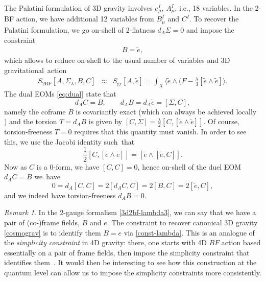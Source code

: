\documentclass[onecolumn]{article}
\theoremstyle{theorem}
\theoremstyle{remark}
\newtheorem{remark}{Remark}[section]
\theoremstyle{example}
\theoremstyle{definition}
\numberwithin{equation}{section}
\newcommand{\beq}{\begin{eqnarray}}
\newcommand{\eeq}{\end{eqnarray}}
\begin{document}
The Palatini formulation of 3D gravity involves  $e_\mu^I, \, A_\mu^I$, i.e., 18 variables. In the 2-BF action, we have additional 12 variables from $B_\mu^I$ and $C^I$. To recover the Palatini formulation, we go on-shell of 2-flatness $d_A\Sigma=0$ and impose the constraint
\beq \label{const-lambda}
B=\tilde e,
\eeq
which allows to reduce on-shell to the usual number of variables and 3D gravitational~action
\begin{eqnarray}
    S_\text{2BF}[A,\Sigma_\lambda  , B,C] &\approx& S_\text{gr}[A,\tilde e]= \int_X \langle \tilde e \wedge(F-\frac{\lambda}{3}[\tilde e\wedge \tilde e]\rangle. \label{cosmograv}
\end{eqnarray}
{The} dual EOMs  \eqref{eq:dual} state that
\begin{equation}
    d_AC = B,\qquad d_AB=d_A\tilde e = [\Sigma,C],\nonumber
\end{equation} 
namely the coframe $B$ is covariantly exact (which can always be achieved locally \cite{Li_1999}) and the torsion $T = d_A B$ is given by $[C, \Sigma]=\frac\lambda2[C,[\tilde e \wedge \tilde e]]$. Of course, torsion-freeness $T=0$ requires that this quantity must vanish.
In order to see this, we  use the Jacobi identity such~that
\begin{equation}
    \frac{1}{2}[C,[\tilde e\wedge \tilde e]] = [\tilde e\wedge [\tilde e,C]].\nonumber
\end{equation}
{Now} as $C$ is a 0-form, we have $[C,C]=0$, hence on-shell of the duel EOM $d_AC=B$ we~have
\begin{equation}
    0=d_A[C,C] = 2[d_AC,C]=2[B,C]=2[\tilde e,C],\nonumber
\end{equation}
and we indeed have torsion-freeness $d_A B= 0$. 




\begin{remark}\label{rmk:simpcon}
In the 2-gauge formalism  \eqref{3d2bf-lambda3}, we can say that we have a pair of (co-)frame fields, $B$ and $e$. The constraint to recover canonical 3D gravity  \eqref{cosmograv} is to identify them $B=e$ via  \eqref{const-lambda}. This is an analogue of the {\it simplicity constraint} in 4D gravity: there, one starts with 4D $BF$ action based essentially on a pair of frame fields, then impose the simplicity constraint that identifies them~\cite{Freidel:2020ayo, Freidel:2020svx, Freidel:2020xyx}.  It would then be interesting to see how this construction at the quantum level can allow us to impose the simplicity constraints more consistently.
\end{remark}
\end{document}
